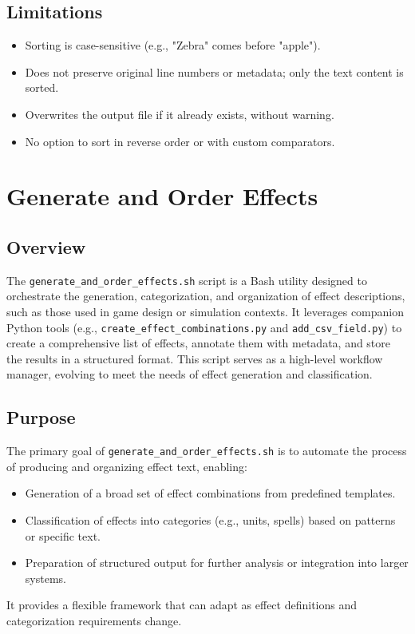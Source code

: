 \subsection{Limitations}
\begin{itemize}
    \item Sorting is case-sensitive (e.g., "Zebra" comes before "apple").
    \item Does not preserve original line numbers or metadata; only the text content is sorted.
    \item Overwrites the output file if it already exists, without warning.
    \item No option to sort in reverse order or with custom comparators.
\end{itemize}












\section{Generate and Order Effects}
\subsection{Overview}
The \texttt{generate\_and\_order\_effects.sh} script is a Bash utility designed to orchestrate the generation, categorization, and organization of effect descriptions, such as those used in game design or simulation contexts. It leverages companion Python tools (e.g., \texttt{create\_effect\_combinations.py} and \texttt{add\_csv\_field.py}) to create a comprehensive list of effects, annotate them with metadata, and store the results in a structured format. This script serves as a high-level workflow manager, evolving to meet the needs of effect generation and classification.

\subsection{Purpose}
The primary goal of \texttt{generate\_and\_order\_effects.sh} is to automate the process of producing and organizing effect text, enabling:
\begin{itemize}
    \item Generation of a broad set of effect combinations from predefined templates.
    \item Classification of effects into categories (e.g., units, spells) based on patterns or specific text.
    \item Preparation of structured output for further analysis or integration into larger systems.
\end{itemize}
It provides a flexible framework that can adapt as effect definitions and categorization requirements change.

